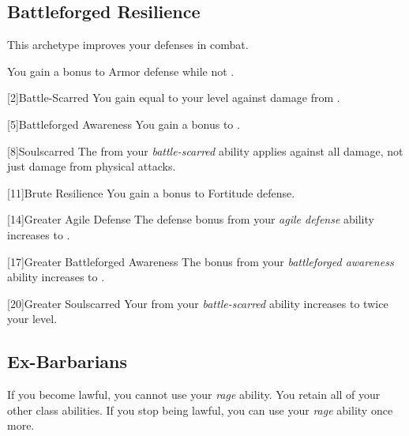     \subsection{Battleforged Resilience}
        This archetype improves your defenses in combat.

         You gain a  bonus to Armor defense while not .

        [2]{Battle-Scarred} You gain  equal to your level against damage from .

        [5]{Battleforged Awareness} You gain a  bonus to .

        [8]{Soulscarred} The  from your \textit{battle-scarred} ability applies against all damage, not just damage from physical attacks.

        [11]{Brute Resilience}
        You gain a  bonus to Fortitude defense.

        [14]{Greater Agile Defense}
        The defense bonus from your \textit{agile defense} ability increases to .

        [17]{Greater Battleforged Awareness}
        The bonus from your \textit{battleforged awareness} ability increases to .

        [20]{Greater Soulscarred}
        Your  from your \textit{battle-scarred} ability increases to twice your level.

    \subsection{Ex-Barbarians}
        If you become lawful, you cannot use your \textit{rage} ability.
        You retain all of your other class abilities.
        If you stop being lawful, you can use your \textit{rage} ability once more.

\newpage
